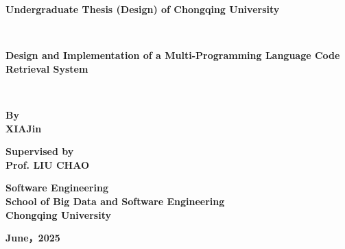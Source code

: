 \documentclass[UTF8,a4paper,12pt]{ctexart}
\numberwithin{equation}{section}
\begin{document}
\newpage
\thispagestyle{empty}
\setmainfont{Times New Roman}
\begin{center}
\textbf{
Undergraduate Thesis (Design) of Chongqing University}
\end{center}
~\\
\begin{center}
\textbf{Design and Implementation of a Multi-Programming Language Code Retrieval System}
\end{center}

~\\
\renewcommand{\headrulewidth}{1pt}
\begin{figure}[htb] 
  \centering
     \end{figure}
     

\setmainfont{Times New Roman}
\begin{center}
\textbf{By}  \\
\textbf{XIAJin}
\end{center}

\begin{center}
\textbf{Supervised by}\\
\textbf{Prof. LIU CHAO}\\
\end{center}

\begin{center}
\textbf{Software Engineering}\\ %
\textbf{	School of Big Data and Software Engineering}\\ %
\textbf{Chongqing University}
\end{center}

\begin{center}
\textbf{June，2025}
\end{center}


\newpage
\pagestyle{fancy}

\end{document}
